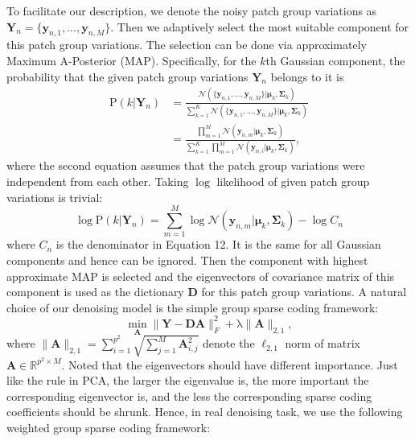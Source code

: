 \documentclass[10pt,twocolumn,letterpaper]{article}
\begin{document}
To facilitate our description, we denote the noisy patch group variations as $\mathbf{Y}_{n} = \{\mathbf{y}_{n,1},...,\mathbf{y}_{n,M}\}$. Then we adaptively select the most suitable component for this patch group variations. The selection can be done via approximately Maximum A-Posterior (MAP). Specifically, for the $k$th Gaussian component, the probability that the given patch group variations $\mathbf{Y}_{n}$ belongs to it is
\begin{equation}
\begin{split}
\mathrm{P}(k|\mathbf{Y}_{n}) &= \frac{\mathcal{N}(\{\mathbf{y}_{n,1},...,\mathbf{y}_{n,M}\}|\mathbf{\mu}_{k},\mathbf{\Sigma}_{k})}{\sum_{k=1}^{K}\mathcal{N}(\{\mathbf{y}_{n,1},...,\mathbf{y}_{n,M}\}|\mathbf{\mu}_{k},\mathbf{\Sigma}_{k})}
\\
&=\frac{\prod_{m=1}^{M}\mathcal{N}(\mathbf{y}_{n,m}|\mathbf{\mu}_{k},\mathbf{\Sigma}_{k})}{\sum_{k=1}^{K}\prod_{m=1}^{M}\mathcal{N}(\mathbf{y}_{n,i}|\mathbf{\mu}_{k},\mathbf{\Sigma}_{k})},
\end{split}
\end{equation}
where the second equation assumes that the patch group variations were independent from each other. Taking $\log$ likelihood of given patch group variations is trivial:
\begin{equation}
\log\mathrm{P}(k|\mathbf{Y}_{n}) = \sum_{m=1}^{M}\log\mathcal{N}(\mathbf{y}_{n,m}|\mathbf{\mu}_{k},\mathbf{\Sigma}_{k})-\log{C_{n}}
\end{equation}
where $C_{n}$ is the denominator in Equation 12. It is the same for all Gaussian components and hence can be ignored. Then the component with highest approximate MAP is selected and the eigenvectors of covariance matrix of this component is used as the dictionary $\mathbf{D}$ for this patch group variations. A natural choice of our denoising model is the simple group sparse coding framework:
\begin{equation}
\min_{\mathbf{A}}{\|\mathbf{Y}-\mathbf{DA}\|_{F}^{2}+\mathrm{\lambda}\|\mathbf{A}\|_{2,1}},
\end{equation}
where $\|\mathbf{A}\|_{2,1} = \sum_{i=1}^{p^{2}}\sqrt{\sum_{j=1}^{M}\mathbf{A}_{i,j}^{2}}$ denote the $\ell_{2,1}$ norm\cite{l21norm} of matrix $\mathbf{A}\in\mathbb{R}^{p^{2}\times M}$. Noted that the eigenvectors should have different importance. Just like the rule in PCA, the larger the eigenvalue is, the more important the corresponding eigenvector is, and the less the corresponding sparse coding coefficients should be shrunk. Hence, in real denoising task, we use the following weighted group sparse coding framework:
\end{document}
